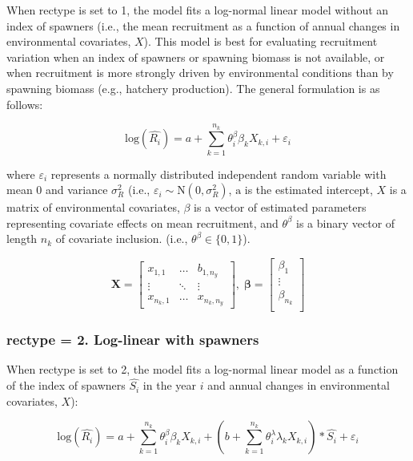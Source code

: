 \documentclass[
]{article}
\begin{document}
When rectype is set to 1, the model fits a log-normal linear model
without an index of spawners (i.e., the mean recruitment as a function
of annual changes in environmental covariates, \({X}\)). This model is
best for evaluating recruitment variation when an index of spawners or
spawning biomass is not available, or when recruitment is more strongly
driven by environmental conditions than by spawning biomass (e.g.,
hatchery production). The general formulation is as follows:

\[ \mathrm{log}(\hat{R_i})= a+\sum_{k=1}^{n_k}{\theta_i^{\beta}\beta_k X_{k,i}}+\varepsilon_i \]

where \(\varepsilon_i\) represents a normally distributed independent
random variable with mean 0 and variance \(\sigma^2_R\) (i.e.,
\(\varepsilon_i\sim \mathrm N(0,\sigma^2_R)\), \(\mathrm a\) is the
estimated intercept, \({X}\) is a matrix of environmental covariates,
\(\beta\) is a vector of estimated parameters representing covariate
effects on mean recruitment, and \({\theta^{\beta}}\) is a binary vector
of length \(n_k\) of covariate inclusion. (i.e.,
\({\theta^{\beta}} \in \{0,1 \}\)).

\[\mathbf{X} = \left[\begin{array}
{rrr}
x_{1,1} & \dots  & b_{1,n_y} \\
\vdots & \ddots & \vdots \\
x_{n_k,1} & \dots  & x_{n_k,n_y} 
\end{array}\right]
,\; \mathbf{\beta} = \left[\begin{array}
{rrr}
\beta_1 \\
\vdots  \\
\beta_{n_k} \\
\end{array}\right]
\]

\hypertarget{rectype-2.-log-linear-with-spawners}{%
\subsubsection{rectype = 2. Log-linear with
spawners}\label{rectype-2.-log-linear-with-spawners}}

When rectype is set to 2, the model fits a log-normal linear model as a
function of the index of spawners \(\hat{S_i}\) in the year \(i\) and
annual changes in environmental covariates, \({X}\)):

\[\mathrm{log}(\hat{R_i})= a + \sum_{k=1}^{n_k}{\theta_i^{\beta}\beta_k X_{k,i}}+ (b+\sum_{k=1}^{n_k}{\theta_i^{\lambda}\lambda_k X_{k,i}})* \hat{S_i}+\varepsilon_i\]
\end{document}
